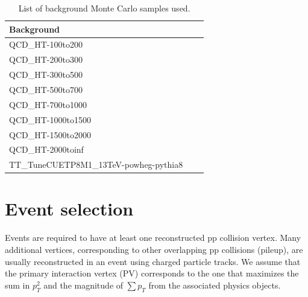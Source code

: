 \begin{table}[htb]
  \begin{center}
    \caption{List of background Monte Carlo samples used. }
    \label{tab:bkg_MC}
    \begin{tabular}{|l|c|c}
      \hline
      Background \\ 
      \hline
      {QCD\_HT-100to200}   \\
      {QCD\_HT-200to300}  \\
      {QCD\_HT-300to500}\\
      {QCD\_HT-500to700}   \\
      {QCD\_HT-700to1000} \\
      {QCD\_HT-1000to1500}  \\
      {QCD\_HT-1500to2000} \\
      {QCD\_HT-2000toinf}   \\
      \hline
      {TT\_TuneCUETP8M1\_13TeV-powheg-pythia8} \\
      \hline
    \end{tabular}
  \end{center}
\end{table}

\section{Event selection}

Events are required to have at least one reconstructed pp collision vertex.
Many additional vertices, corresponding to other overlapping pp collisions (pileup), are usually reconstructed in an event using charged particle tracks. We assume that the primary interaction vertex (PV) corresponds to the one that maximizes the sum in $p_{T}^2$ and the magnitude of $\sum{p_{T}}$ from the associated physics objects. 

